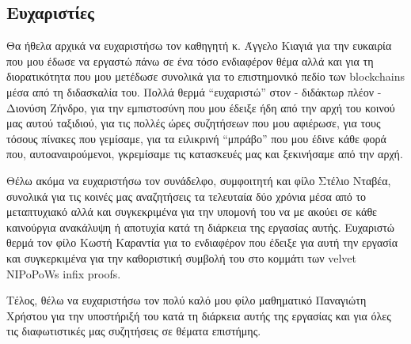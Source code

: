 \newpage
\begin{center}
    \section*{Ευχαριστίες}
\end{center}
Θα ήθελα αρχικά να ευχαριστήσω τον καθηγητή κ. Άγγελο Κιαγιά για την ευκαιρία που μου έδωσε να εργαστώ πάνω σε ένα τόσο ενδιαφέρον θέμα αλλά και για τη διορατικότητα που μου μετέδωσε συνολικά για το επιστημονικό πεδίο των blockchains μέσα από τη διδασκαλία του. Πολλά θερμά ``ευχαριστώ'' στον - διδάκτωρ πλέον - Διονύση Ζήνδρο, για την εμπιστοσύνη που μου έδειξε ήδη από την αρχή του κοινού μας αυτού ταξιδιού, για τις πολλές ώρες συζητήσεων που μου αφιέρωσε, για τους τόσους πίνακες που γεμίσαμε, για τα ειλικρινή ``μπράβο'' που μου έδινε κάθε φορά που, αυτοαναιρούμενοι, γκρεμίσαμε τις κατασκευές μας και ξεκινήσαμε από την αρχή. 

Θέλω ακόμα να ευχαριστήσω τον συνάδελφο, συμφοιτητή και φίλο Στέλιο Νταβέα, συνολικά για τις κοινές μας αναζητήσεις τα τελευταία δύο χρόνια μέσα από το μεταπτυχιακό αλλά και συγκεκριμένα για την υπομονή του να με ακούει σε κάθε καινούργια ανακάλυψη ή αποτυχία κατά τη διάρκεια της εργασίας αυτής. Ευχαριστώ θερμά τον φίλο Κωστή Καραντία για το ενδιαφέρον που έδειξε για αυτή την εργασία και συγκερκιμένα για την καθοριστική συμβολή του στο κομμάτι των velvet NIPoPoWs infix proofs. 

Τέλος, θέλω να ευχαριστήσω τον πολύ καλό μου φίλο μαθηματικό Παναγιώτη Χρήστου για την υποστήριξή του κατά τη διάρκεια αυτής της εργασίας και για όλες τις διαφωτιστικές μας συζητήσεις σε θέματα επιστήμης.
